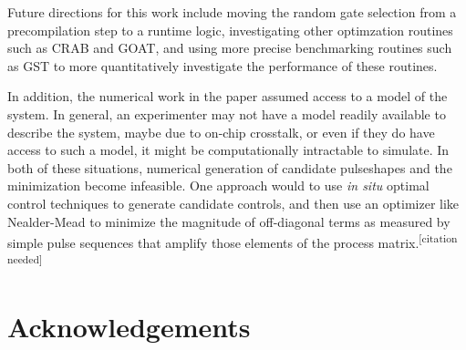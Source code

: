 \documentclass[aps,nofootinbib,pra,notitlepage,twocolumn]{revtex4-1}
\newcommand{\needcite}{{\color{blue}\textsuperscript{[citation needed]}}}
\begin{document}
Future directions for this work include moving the random gate selection from a precompilation step to a runtime logic, investigating other optimzation routines such as CRAB \cite{Caneva2011} and GOAT\cite{Machnes2018}, and using more precise benchmarking routines such as GST\cite{BlumeKohout2017} to more quantitatively investigate the performance of these routines.

In addition, the numerical work in the paper assumed access to a model of the system. In general, an experimenter may not have a model readily available to describe the system, maybe due to on-chip crosstalk, or even if they do have access to such a model, it might be computationally intractable to simulate. In both of these situations, numerical generation of candidate pulseshapes and the minimization become infeasible. One approach would to use \textit{in situ} optimal control techniques \cite{Wu2018, Kelly2014, Ferrie2015} to generate candidate controls, and then use an optimizer like Nealder-Mead to minimize the magnitude of off-diagonal terms as measured by simple pulse sequences that amplify those elements of the process matrix.\needcite

\section{Acknowledgements}




\end{document}
